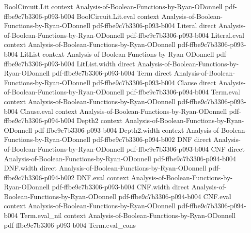 \begin{theorem}
\leanok
{}
\proofstep
  {BoolCircuit.Lit}
  {context}
  {Analysis-of-Boolean-Functions-by-Ryan-ODonnell}
  {pdf-ffbe9c7b3306-p093-b004}
\proofstep
  {BoolCircuit.Lit.eval}
  {context}
  {Analysis-of-Boolean-Functions-by-Ryan-ODonnell}
  {pdf-ffbe9c7b3306-p093-b004}
\proofstep
  {Literal}
  {direct}
  {Analysis-of-Boolean-Functions-by-Ryan-ODonnell}
  {pdf-ffbe9c7b3306-p093-b004}
\proofstep
  {Literal.eval}
  {context}
  {Analysis-of-Boolean-Functions-by-Ryan-ODonnell}
  {pdf-ffbe9c7b3306-p093-b004}
\proofstep
  {LitList}
  {context}
  {Analysis-of-Boolean-Functions-by-Ryan-ODonnell}
  {pdf-ffbe9c7b3306-p093-b004}
\proofstep
  {LitList.width}
  {direct}
  {Analysis-of-Boolean-Functions-by-Ryan-ODonnell}
  {pdf-ffbe9c7b3306-p093-b004}
\proofstep
  {Term}
  {direct}
  {Analysis-of-Boolean-Functions-by-Ryan-ODonnell}
  {pdf-ffbe9c7b3306-p093-b004}
\proofstep
  {Clause}
  {direct}
  {Analysis-of-Boolean-Functions-by-Ryan-ODonnell}
  {pdf-ffbe9c7b3306-p094-b004}
\proofstep
  {Term.eval}
  {context}
  {Analysis-of-Boolean-Functions-by-Ryan-ODonnell}
  {pdf-ffbe9c7b3306-p093-b004}
\proofstep
  {Clause.eval}
  {context}
  {Analysis-of-Boolean-Functions-by-Ryan-ODonnell}
  {pdf-ffbe9c7b3306-p094-b004}
\proofstep
  {Depth2}
  {context}
  {Analysis-of-Boolean-Functions-by-Ryan-ODonnell}
  {pdf-ffbe9c7b3306-p093-b004}
\proofstep
  {Depth2.width}
  {context}
  {Analysis-of-Boolean-Functions-by-Ryan-ODonnell}
  {pdf-ffbe9c7b3306-p094-b002}
\proofstep
  {DNF}
  {direct}
  {Analysis-of-Boolean-Functions-by-Ryan-ODonnell}
  {pdf-ffbe9c7b3306-p093-b004}
\proofstep
  {CNF}
  {direct}
  {Analysis-of-Boolean-Functions-by-Ryan-ODonnell}
  {pdf-ffbe9c7b3306-p094-b004}
\proofstep
  {DNF.width}
  {direct}
  {Analysis-of-Boolean-Functions-by-Ryan-ODonnell}
  {pdf-ffbe9c7b3306-p094-b002}
\proofstep
  {DNF.eval}
  {context}
  {Analysis-of-Boolean-Functions-by-Ryan-ODonnell}
  {pdf-ffbe9c7b3306-p093-b004}
\proofstep
  {CNF.width}
  {direct}
  {Analysis-of-Boolean-Functions-by-Ryan-ODonnell}
  {pdf-ffbe9c7b3306-p094-b004}
\proofstep
  {CNF.eval}
  {context}
  {Analysis-of-Boolean-Functions-by-Ryan-ODonnell}
  {pdf-ffbe9c7b3306-p094-b004}
\proofstep
  {Term.eval_nil}
  {context}
  {Analysis-of-Boolean-Functions-by-Ryan-ODonnell}
  {pdf-ffbe9c7b3306-p093-b004}
\proofstep
  {Term.eval_cons}

\end{theorem}
